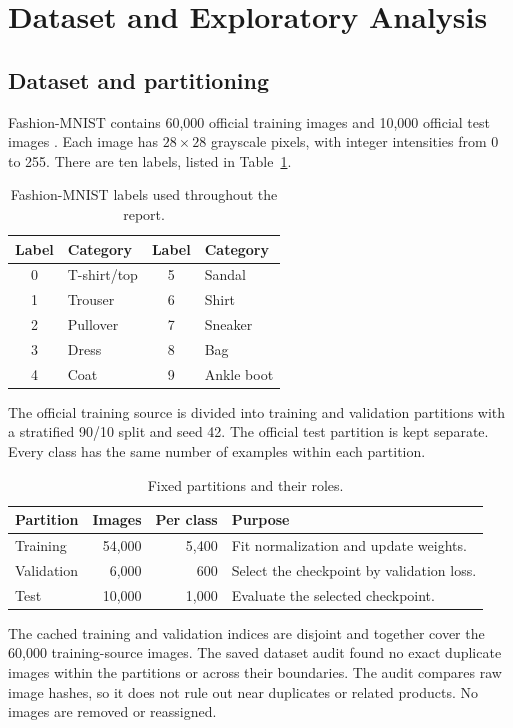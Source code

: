 \section{Dataset and Exploratory Analysis}
\label{sec:dataset}
\subsection{Dataset and partitioning}
Fashion-MNIST contains 60,000 official training images and 10,000 official test
images \cite{fresh_fashion,dataset_repository}. Each image has $28\times28$
grayscale pixels, with integer intensities from 0 to 255. There are ten labels,
listed in Table~\ref{tab:labels}.

\begin{table}[H]\centering
\caption{Fashion-MNIST labels used throughout the report.}\label{tab:labels}
\begin{tabular}{clcl}\toprule
Label & Category & Label & Category\\\midrule
0 & T-shirt/top & 5 & Sandal\\
1 & Trouser & 6 & Shirt\\
2 & Pullover & 7 & Sneaker\\
3 & Dress & 8 & Bag\\
4 & Coat & 9 & Ankle boot\\\bottomrule
\end{tabular}
\end{table}

The official training source is divided into training and validation partitions
with a stratified 90/10 split and seed 42. The official test partition is kept
separate. Every class has the same number of examples within each partition.

\begin{table}[H]\centering
\caption{Fixed partitions and their roles.}\label{tab:splits}
\begin{tabularx}{\linewidth}{lrrX}\toprule
Partition & Images & Per class & Purpose\\\midrule
Training & 54,000 & 5,400 & Fit normalization and update weights.\\
Validation & 6,000 & 600 & Select the checkpoint by validation loss.\\
Test & 10,000 & 1,000 & Evaluate the selected checkpoint.\\\bottomrule
\end{tabularx}
\end{table}

The cached training and validation indices are disjoint and together cover the
60,000 training-source images. The saved dataset audit found no exact duplicate
images within the partitions or across their boundaries. The audit compares raw
image hashes, so it does not rule out near duplicates or related products.
No images are removed or reassigned.

